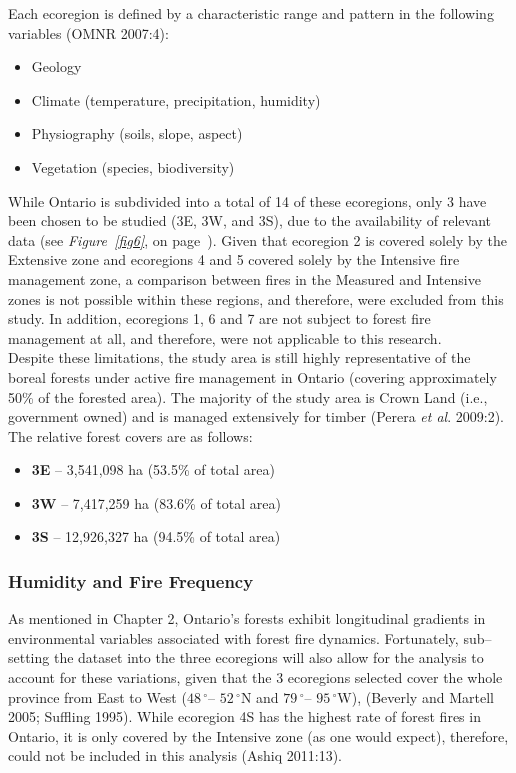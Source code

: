 \begin{spacing}{1.5}
\noindent Each ecoregion is defined by a characteristic range and pattern in the following variables (OMNR 2007:4):

\begin{itemize}
  \item Geology
  \item Climate (temperature, precipitation, humidity)
  \item Physiography (soils, slope, aspect)
  \item Vegetation (species, biodiversity)\\
\end{itemize}

\noindent While Ontario is subdivided into a total of 14 of these ecoregions, only 3 have been chosen to be studied (3E, 3W, and 3S), due to the availability of relevant data (see \emph{Figure~\ref{fig6}}, on page~\pageref{fig6}). Given that ecoregion 2 is covered solely by the Extensive zone and ecoregions 4 and 5 covered solely by the Intensive fire management zone, a comparison between fires in the Measured and Intensive zones is not possible within these regions, and therefore, were excluded from this study. In addition, ecoregions 1, 6 and 7 are not subject to forest fire management at all, and therefore, were not applicable to this research.\\

\noindent Despite these limitations, the study area is still highly representative of the boreal forests under active fire management in Ontario (covering approximately 50\% of the forested area). The majority of the study area is Crown Land (i.e., government owned) and is managed extensively for timber (Perera \emph{et al}. 2009:2). The relative forest covers are as follows:

\begin{itemize}
  \item \textbf{3E} -- 3,541,098 ha (53.5\% of total area)
  \item \textbf{3W} -- 7,417,259 ha (83.6\% of total area)
  \item \textbf{3S} -- 12,926,327 ha (94.5\% of total area) 
\end{itemize}

\subsubsection{Humidity and Fire Frequency}

As mentioned in Chapter 2, Ontario's forests exhibit longitudinal gradients in environmental variables associated with forest fire dynamics. Fortunately, sub--setting the dataset into the three ecoregions will also allow for the analysis to account for these variations, given that the 3 ecoregions selected cover the whole province from East to West ($48\,^{\circ}$-- $52\,^{\circ}$N and $79\,^{\circ}$-- $95\,^{\circ}$W), (Beverly and Martell 2005; Suffling 1995). While ecoregion 4S has the highest rate of forest fires in Ontario, it is only covered by the Intensive zone (as one would expect), therefore, could not be included in this analysis (Ashiq 2011:13). \\


\end{spacing}
